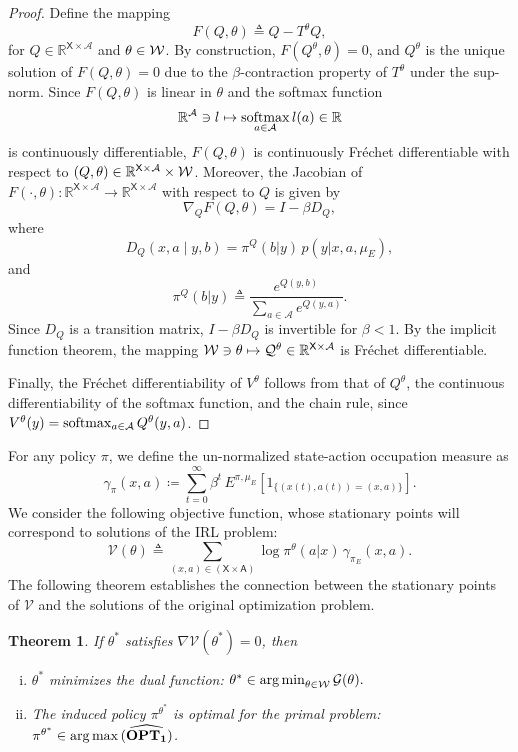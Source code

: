 \documentclass[11pt]{article}
\newcommand{\softmax}{\mathop{\rm softmax}}
\newcommand{\argmax}{\mathop{\rm arg\, max}}
\newcommand{\argmin}{\mathop{\rm arg\, min}}
\newcommand{\sX}{{\mathsf X}}
\newcommand{\sA}{{\mathsf A}}
\newcommand{\V}{{\mathcal V}}
\newcommand{\cG}{{\mathcal G}}
\newtheorem{theorem}{Theorem}[section]
\begin{document}
\begin{proof}
Define the mapping
\[
F(Q,\theta) \triangleq Q - T^{\theta} Q,
\]
for $Q \in \mathbb{R}^{\sX \times \mathcal{A}}$ and $\theta \in \cal W$. By construction, $F(Q^{\theta},\theta) = 0$, and $Q^{\theta}$ is the unique solution of $F(Q,\theta) = 0$ due to the $\beta$-contraction property of $T^{\theta}$ under the sup-norm. 
Since $F(Q,\theta)$ is linear in $\theta$ and the softmax function
\[
\mathbb{R}^{\mathcal{A}} \ni l \mapsto \softmax_{a \in \mathcal{A}} l(a) \in \mathbb{R}
\]
is continuously differentiable, $F(Q,\theta)$ is continuously Fr\'echet differentiable with respect to $(Q,\theta) \in \mathbb{R}^{\sX \times \mathcal{A}} \times \cal W$. Moreover, the Jacobian of $F(\cdot,\theta): \mathbb{R}^{\sX \times \mathcal{A}} \to \mathbb{R}^{\sX \times \mathcal{A}}$ with respect to $Q$ is given by
\[
\nabla_Q F(Q,\theta) = I - \beta D_Q,
\]
where
\[
D_Q(x,a \mid y,b) = \pi^Q(b|y) \, p(y|x,a,\mu_E),\] and
\[\pi^Q(b|y) \triangleq \frac{e^{Q(y,b)}}{\sum_{a \in \mathcal{A}} e^{Q(y,a)}}.
\]
Since $D_Q$ is a transition matrix, $I - \beta D_Q$ is invertible for $\beta < 1$. By the implicit function theorem, the mapping $\cal W \ni \theta \mapsto Q^{\theta} \in \mathbb{R}^{\sX \times \mathcal{A}}$ is Fr\'echet differentiable.

Finally, the Fr\'echet differentiability of $V^{\theta}$ follows from that of $Q^{\theta}$, the continuous differentiability of the softmax function, and the chain rule, since $V^{\theta}(y) = \softmax_{a \in \mathcal{A}} Q^{\theta}(y,a)$.
\end{proof}



For any policy $\pi$, we define the un-normalized state-action occupation measure as 
$$
\gamma_{\pi}(x,a) \coloneqq \sum_{t=0}^{\infty} \beta^t \, E^{\pi,\mu_E} \left[ 1_{\{(x(t),a(t)) = (x,a)\}} \right].
$$
We consider the following objective function, whose stationary points will correspond to solutions of the IRL problem:
$$
\V(\theta) \triangleq \sum_{(x,a) \in (\sX\times\sA)} \log \pi^{\theta}(a|x) \, \gamma_{\pi_E}(x,a).
$$
The following theorem establishes the connection between the stationary points of $\V$ and the solutions of the original optimization problem.


\begin{theorem}\label{equivv3}
If $\theta^*$ satisfies $\nabla \V(\theta^*) = 0$, then
\begin{enumerate}[(i)]
\item $\theta^*$ minimizes the dual function: $\theta^* \in \argmin_{\theta \in \mathcal{W}} \cG(\theta).$
\item The induced policy $\pi^{\theta^*}$ is optimal for the primal problem: $\pi^{\theta^*} \in \argmax  \mathbf{\widehat{(OPT_1)}}$.
\end{enumerate}
\end{theorem}
\end{document}
